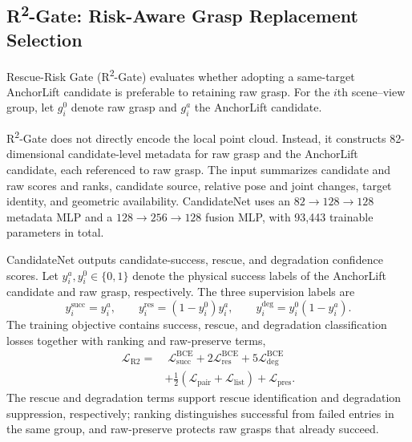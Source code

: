 \documentclass[lettersize,journal]{IEEEtran}
\begin{document}
\subsection{R\textsuperscript{2}-Gate: Risk-Aware Grasp Replacement Selection}

Rescue-Risk Gate (R\textsuperscript{2}-Gate) evaluates whether adopting a same-target AnchorLift candidate is preferable to retaining raw grasp. For the $i$th scene--view group, let $g_i^0$ denote raw grasp and $g_i^a$ the AnchorLift candidate.

R\textsuperscript{2}-Gate does not directly encode the local point cloud. Instead, it constructs 82-dimensional candidate-level metadata for raw grasp and the AnchorLift candidate, each referenced to raw grasp. The input summarizes candidate and raw scores and ranks, candidate source, relative pose and joint changes, target identity, and geometric availability. CandidateNet uses an $82\!\rightarrow\!128\!\rightarrow\!128$ metadata MLP and a $128\!\rightarrow\!256\!\rightarrow\!128$ fusion MLP, with 93,443 trainable parameters in total.

CandidateNet outputs candidate-success, rescue, and degradation confidence scores. Let $y_i^a,y_i^0\in\{0,1\}$ denote the physical success labels of the AnchorLift candidate and raw grasp, respectively. The three supervision labels are
\begin{equation}
y_i^{\mathrm{succ}}=y_i^a,\qquad
y_i^{\mathrm{res}}=(1-y_i^0)y_i^a,\qquad
y_i^{\mathrm{deg}}=y_i^0(1-y_i^a).
\tag{5}\label{eq:r2_labels}
\end{equation}
The training objective contains success, rescue, and degradation classification losses together with ranking and raw-preserve terms,
\begin{equation}
\begin{aligned}
\mathcal L_{\mathrm{R2}}
=&\;\mathcal L_{\mathrm{succ}}^{\mathrm{BCE}}
+2\mathcal L_{\mathrm{res}}^{\mathrm{BCE}}
+5\mathcal L_{\mathrm{deg}}^{\mathrm{BCE}}\\
&+\frac{1}{2}\left(\mathcal L_{\mathrm{pair}}+\mathcal L_{\mathrm{list}}\right)
+\mathcal L_{\mathrm{pres}}.
\end{aligned}
\tag{6}\label{eq:r2gate_loss}
\end{equation}
The rescue and degradation terms support rescue identification and degradation suppression, respectively; ranking distinguishes successful from failed entries in the same group, and raw-preserve protects raw grasps that already succeed.
\end{document}
